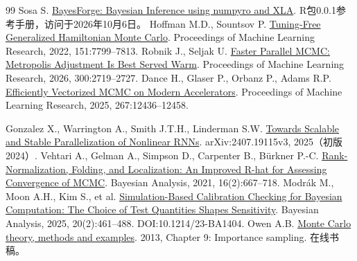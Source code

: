\begin{thebibliography}{99}
 Sosa S. \href{https://cran.r-universe.dev/BayesForge/doc/manual.html}{BayesForge: Bayesian Inference using numpyro and XLA}. R包0.0.1参考手册，访问于2026年10月6日。
 Hoffman M.D., Sountsov P. \href{https://proceedings.mlr.press/v151/hoffman22a.html}{Tuning-Free Generalized Hamiltonian Monte Carlo}. Proceedings of Machine Learning Research, 2022, 151:7799--7813.
 Robnik J., Seljak U. \href{https://proceedings.mlr.press/v300/robnik26a.html}{Faster Parallel MCMC: Metropolis Adjustment Is Best Served Warm}. Proceedings of Machine Learning Research, 2026, 300:2719--2727.
 Dance H., Glaser P., Orbanz P., Adams R.P. \href{https://proceedings.mlr.press/v267/dance25a.html}{Efficiently Vectorized MCMC on Modern Accelerators}. Proceedings of Machine Learning Research, 2025, 267:12436--12458.

 Gonzalez X., Warrington A., Smith J.T.H., Linderman S.W. \href{https://arxiv.org/abs/2407.19115v3}{Towards Scalable and Stable Parallelization of Nonlinear RNNs}. arXiv:2407.19115v3, 2025（初版2024）.
 Vehtari A., Gelman A., Simpson D., Carpenter B., Bürkner P.-C. \href{https://doi.org/10.1214/20-BA1221}{Rank-Normalization, Folding, and Localization: An Improved R-hat for Assessing Convergence of MCMC}. Bayesian Analysis, 2021, 16(2):667--718.
 Modrák M., Moon A.H., Kim S., et al. \href{https://doi.org/10.1214/23-BA1404}{Simulation-Based Calibration Checking for Bayesian Computation: The Choice of Test Quantities Shapes Sensitivity}. Bayesian Analysis, 2025, 20(2):461--488. DOI:10.1214/23-BA1404.
 Owen A.B. \href{https://artowen.su.domains/mc/}{Monte Carlo theory, methods and examples}. 2013, Chapter 9: Importance sampling. 在线书稿。

\end{thebibliography}
